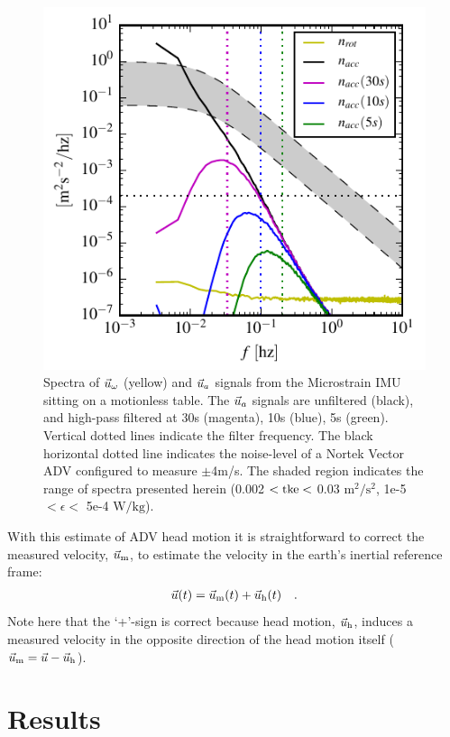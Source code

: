 \documentclass[twocol]{ametsoc}
\newlength{\onewidth}
\begin{document}
\begin{figure}
  \centering
  \label{fig:stationary_noise}
  \includegraphics[width=\onewidth]{stationary_noise03}
  \caption{Spectra of $\vec{u}_\omega$ (yellow) and $\vec{u}_a$ signals from the Microstrain IMU sitting on a motionless table. The $\vec{u}_a$ signals are unfiltered (black), and high-pass filtered at 30s (magenta), 10s (blue), 5s (green). Vertical dotted lines indicate the filter frequency. The black horizontal dotted line indicates the noise-level of a Nortek Vector ADV configured to measure $\pm$4m/s. The shaded region indicates the range of spectra presented herein (0.002 $< \mathrm{tke} <$ 0.03 $\mathrm{m^2/s^2}$, 1e-5 $< \epsilon <$ 5e-4 $\mathrm{W/kg}$).}
\end{figure}

With this estimate of ADV head motion it is straightforward to correct the measured velocity, $\vec{u}_\mathrm{m}$, to estimate the velocity in the earth's inertial reference frame:
\begin{align}
  \label{eqn:u_mot_def}
  \vec{u}(t) & = \vec{u}_\mathrm{m}(t) + \vec{u}_\mathrm{h}(t) &  .
\end{align}
Note here that the `+'-sign is correct because head motion, $\vec{u}_\mathrm{h}$, induces a measured velocity in the opposite direction of the head motion itself ($\vec{u}_\mathrm{m} = \vec{u} - \vec{u}_\mathrm{h}$).

\section{Results}
\end{document}
